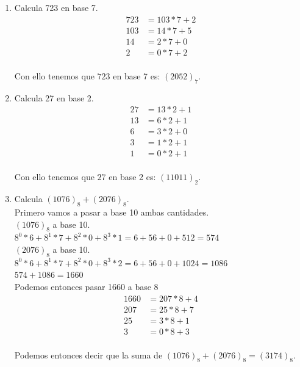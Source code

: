 \documentclass[12pt]{article}
\begin{document}
\begin{enumerate}[label=\alph*)]
    \item Calcula 723 en base 7.
        \begin{align*}    
            723 &= 103 \ast 7 + 2\\
            103& = 14 \ast 7 + 5\\
            14 &= 2 \ast 7 + 0\\
            2 &= 0 \ast 7 + 2\\
        \end{align*}

        Con ello tenemos que $723$ en base 7 es: $(2052)_7$.

    \item Calcula 27 en base 2.
        \begin{align*}
            27 &= 13 \ast 2 + 1\\
            13 &= 6 \ast 2 + 1\\
            6 &= 3 \ast 2 + 0\\
            3 &= 1 \ast 2 + 1\\
            1 &= 0 \ast 2 + 1\\
        \end{align*}

        Con ello tenemos que $27$ en base 2 es: $(11011)_2$.\\

    \item Calcula $(1076)_8 + (2076)_8$.\\

        Primero vamos a pasar a base 10 ambas cantidades.\\

        $(1076)_8$ a base 10.\\
        $8^0 \ast 6 + 8^1 \ast 7 + 8^2 \ast 0 + 8^3 \ast 1 = 6 + 56 + 0 + 512 = 574$\\

        $(2076)_8$ a base 10.\\
        $8^0 \ast 6 + 8^1 \ast 7 + 8^2 \ast 0 + 8^3 \ast 2 = 6 + 56 + 0 + 1024 = 1086$\\

        $574 + 1086 = 1660$\\

        Podemos entonces pasar 1660 a base 8\\
        \begin{align*}
            1660 &= 207 \ast 8 + 4\\
            207 &= 25 \ast 8 + 7\\
            25 &= 3 \ast 8 + 1\\
            3 &= 0 \ast 8 + 3\\
        \end{align*}

        Podemos entonces decir que la suma de $(1076)_8 + (2076)_8 = (3174)_8$.
\end{enumerate}
\end{document}
